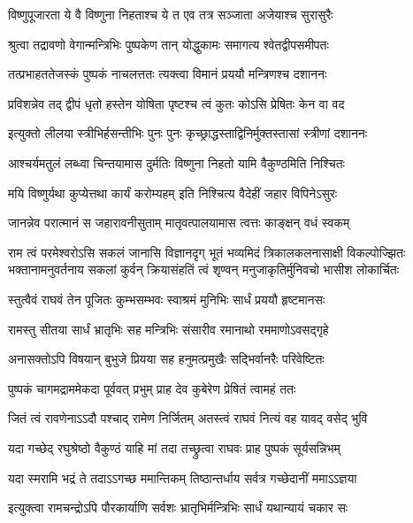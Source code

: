 \twolineshloka
{विष्णुपूजारता ये वै विष्णुना निहताश्च ये}
{त एव तत्र सञ्जाता अजेयाश्च सुरासुरैः} %

\twolineshloka
{श्रुत्वा तद्रावणो वेगान्मन्त्रिभिः पुष्पकेण तान्}
{योद्धुकामः समागत्य श्वेतद्वीपसमीपतः} %

\twolineshloka
{तत्प्रभाहततेजस्कं पुष्पकं नाचलत्ततः}
{त्यक्त्वा विमानं प्रययौ मन्त्रिणश्च दशाननः} %

\twolineshloka
{प्रविशन्नेव तद् द्वीपं धृतो हस्तेन योषिता}
{पृष्टश्च त्वं कुतः कोऽसि प्रेषितः केन वा वद} %

\twolineshloka
{इत्युक्तो लीलया स्त्रीभिर्हसन्तीभिः पुनः पुनः}
{कृच्छ्राद्धस्ताद्विनिर्मुक्तस्तासां स्त्रीणां दशाननः} %

\twolineshloka
{आश्चर्यमतुलं लब्ध्वा चिन्तयामास दुर्मतिः}
{विष्णुना निहतो यामि वैकुण्ठमिति निश्चितः} %

\twolineshloka
{मयि विष्णुर्यथा कुप्येत्तथा कार्यं करोम्यहम्}
{इति निश्चित्य वैदेहीं जहार विपिनेऽसुरः} %

\twolineshloka
{जानन्नेव परात्मानं स जहारावनीसुताम्}
{मातृवत्पालयामास त्वत्तः काङ्क्षन् वधं स्वकम्} %

\fourlineindentedshloka
{राम त्वं परमेश्वरोऽसि सकलं जानासि विज्ञानदृग्}
{भूतं भव्यमिदं त्रिकालकलनासाक्षी विकल्पोज्झितः}
{भक्तानामनुवर्तनाय सकलां कुर्वन् क्रियासंहतिं}
{त्वं शृण्वन् मनुजाकृतिर्मुनिवचो भासीश लोकार्चितः} %

\twolineshloka
{स्तुत्वैवं राघवं तेन पूजितः कुम्भसम्भवः}
{स्वाश्रमं मुनिभिः सार्धं प्रययौ हृष्टमानसः} %

\twolineshloka
{रामस्तु सीतया सार्धं भ्रातृभिः सह मन्त्रिभिः}
{संसारीव रमानाथो रममाणोऽवसद्गृहे} %

\twolineshloka
{अनासक्तोऽपि विषयान् बुभुजे प्रियया सह}
{हनुमत्प्रमुखैः सद्भिर्वानरैः परिवेष्टितः} %

\twolineshloka
{पुष्पकं चागमद्राममेकदा पूर्ववत् प्रभुम्}
{प्राह देव कुबेरेण प्रेषितं त्वामहं ततः} %

\twolineshloka
{जितं त्वं रावणेनाऽऽदौ पश्चाद् रामेण निर्जितम्}
{अतस्त्वं राघवं नित्यं वह यावद् वसेद् भुवि} %

\twolineshloka
{यदा गच्छेद् रघुश्रेष्ठो वैकुण्ठं याहि मां तदा}
{तच्छ्रुत्वा राघवः प्राह पुष्पकं सूर्यसन्निभम्} %

\twolineshloka
{यदा स्मरामि भद्रं ते तदाऽऽगच्छ ममान्तिकम्}
{तिष्ठान्तर्धाय सर्वत्र गच्छेदानीं ममाऽऽज्ञया} %

\twolineshloka
{इत्युक्त्वा रामचन्द्रोऽपि पौरकार्याणि सर्वशः}
{भ्रातृभिर्मन्त्रिभिः सार्धं यथान्यायं चकार सः} %


